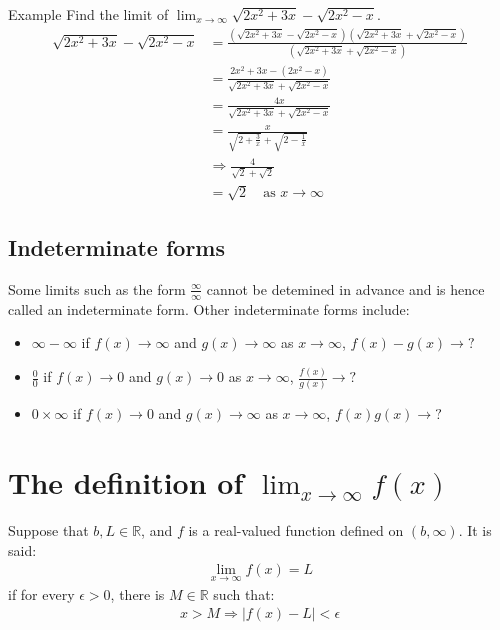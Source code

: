 \documentclass{report}
\begin{document}
		\begin{question}{Example}
			Find the limit of $\displaystyle\lim_{x\to\infty} \sqrt{2x^2 + 3x} - \sqrt{2x^2 - x}$.
			\begin{align*}
				\sqrt{2x^2 + 3x} - \sqrt{2x^2 - x} &= \frac{\left(\sqrt{2x^2 + 3x} - \sqrt{2x^2 - x} \right) \left(\sqrt{2x^2 + 3x} + \sqrt{2x^2 - x} \right)}{\left(\sqrt{2x^2 + 3x} + \sqrt{2x^2 - x} \right)}	\\
												   &= \frac{2x^2 + 3x - \left(2x^2 -x\right)}{\sqrt{2x^2 + 3x} + \sqrt{2x^2 -x}}	\\
												   &= \frac{4x}{\sqrt{2x^2 + 3x} + \sqrt{2x^2 - x}}	\\
												   &= \frac{x}{\sqrt{2 + \frac{3}{x}} + \sqrt{2 - \frac{1}{x}}}	\\
												   & \Rightarrow \frac{4}{\sqrt{2} + \sqrt{2}}	\\
												   &= \sqrt{2} \quad \text{as } x \rightarrow \infty
			\end{align*}
		\end{question}

	\subsection{Indeterminate forms}
		
		Some limits such as the form $\frac{\infty}{\infty}$ cannot be detemined in advance and is hence called an indeterminate form. Other indeterminate forms include:
		\begin{itemize}
			\item $\infty - \infty$ if $f(x) \rightarrow \infty$ and $g(x) \rightarrow \infty$ as $x \rightarrow \infty$, \quad $f(x) - g(x) \rightarrow ?$
			\item $\frac{0}{0}$ if $f(x) \rightarrow 0$ and $g(x) \rightarrow 0$ as $x \rightarrow \infty$, \quad $\frac{f(x)}{g(x)} \rightarrow ?$
			\item $0 \times \infty$ if $f(x) \rightarrow 0$ and $g(x) \rightarrow \infty$ as $x \rightarrow \infty$, \quad $f(x)g(x) \rightarrow ?$
		\end{itemize}

\section{The definition of $\displaystyle\lim_{x\to\infty} f(x)$}

	Suppose that $b, L \in \mathbb{R}$, and $f$ is a real-valued function defined on $(b, \infty)$. It is said:
		\begin{align*}
			\lim_{x\to\infty} f(x) = L
		\end{align*}
	if for every $\epsilon > 0$, there is $M \in \mathbb{R}$ such that:
		\begin{align*}
			x > M \Rightarrow |f(x) - L| < \epsilon
		\end{align*}
\end{document}
